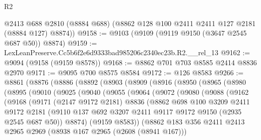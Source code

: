 \begin{lexlean}{R2}
\begin{coremodule}
      @2413
      @688
      @2810
      (@8884 @688)
      (@8862 @128 @100 @2411 @2411 @127 @2181 (@8884 @127) @8874))
@9158 := @9103 (@9109 (@9119 @9150 (@3647 @2545 @687 @50)) @8874)
@9159 := LexLeanPreserve.Cc5b6f2e6d9333bad985206c2340ec23b.R2.__rel_13
@9162 := @9094 (@9158 (@9159 @8578))
@9168 := @8862 @701 @703 @8585 @2414 @8836 @2970
@9171 := @9095 @700 @8575 @8584
@9172 := @126 @8583
@9266 := @8861
    (@8876
      (@8886
        (@8892
          (@8903
            (@8909
              (@8916
                (@8950
                  (@8965
                    (@8980
                      (@8995
                        (@9010
                          (@9025
                            (@9040
                              (@9055
                                (@9064
                                  (@9072
                                    (@9080
                                      (@9088
                                        (@9162
                                          (@9168
                                            (@9171
                                              (@2147 @9172 @2181)
                                              @8836
                                              (@8862
                                                @698
                                                @100
                                                @3209
                                                @2411
                                                @9172
                                                @2181
                                                (@9110
                                                  @137
                                                  @692
                                                  @3207
                                                  @2411
                                                  @9117
                                                  @9172
                                                  @9150
                                                  (@2935 @2545 @687 @50))
                                                @8874)
                                              (@9159 @8583))
                                            (@8862
                                              @183
                                              @356
                                              @2411
                                              @2413
                                              @2965
                                              @2969
                                              (@8938 @167 @2965 (@2608 (@8941 @167)))

\end{coremodule}
\end{lexlean}
